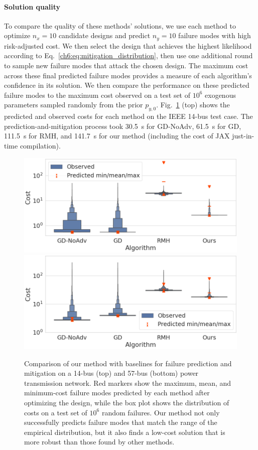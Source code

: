 \paragraph{Solution quality} To compare the quality of these methods' solutions, we use each method to optimize $n_x = 10$ candidate designs and predict $n_y=10$ failure modes with high risk-adjusted cost. We then select the design that achieves the highest likelihood according to Eq.~\eqref{ch6:eq:mitigation_distribution}, then use one additional round to sample new failure modes that attack the chosen design. The maximum cost across these final predicted failure modes provides a measure of each algorithm's confidence in its solution. We then compare the performance on these predicted failure modes to the maximum cost observed on a test set of $10^6$ exogenous parameters sampled randomly from the prior $p_{y, 0}$. Fig.~\ref{global:fig:14_bus_comparison} (top) shows the predicted and observed costs for each method on the IEEE 14-bus test case. The prediction-and-mitigation process took \SI{30.5}{s} for GD-NoAdv, \SI{61.5}{s} for GD, \SI{111.5}{s} for RMH, and \SI{141.7}{s} for our method (including the cost of JAX just-in-time compilation).

\begin{figure}[tb]
    \centering
    \includegraphics[width=0.45\linewidth]{images/global_methods/14_bus_comparison.png}
    \includegraphics[width=0.45\linewidth]{images/global_methods/57_bus_comparison.png}
    \caption{Comparison of our method with baselines for failure prediction and mitigation on a 14-bus (top) and 57-bus (bottom) power transmission network. Red markers show the maximum, mean, and minimum-cost failure modes predicted by each method after optimizing the design, while the box plot shows the distribution of costs on a test set of $10^6$ random failures. Our method not only successfully predicts failure modes that match the range of the empirical distribution, but it also finds a low-cost solution that is more robust than those found by other methods.}
    \label{global:fig:14_bus_comparison}
\end{figure}

